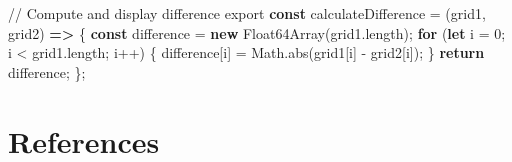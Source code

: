 \documentclass[
  letterpaper,
  DIV=11,
  numbers=noendperiod]{scrreprt}
\newenvironment{Shaded}{\begin{snugshade}}{\end{snugshade}}
\newcommand{\AttributeTok}[1]{\textcolor[rgb]{0.40,0.45,0.13}{#1}}
\newcommand{\BuiltInTok}[1]{\textcolor[rgb]{0.00,0.23,0.31}{#1}}
\newcommand{\CommentTok}[1]{\textcolor[rgb]{0.37,0.37,0.37}{#1}}
\newcommand{\ControlFlowTok}[1]{\textcolor[rgb]{0.00,0.23,0.31}{\textbf{#1}}}
\newcommand{\DecValTok}[1]{\textcolor[rgb]{0.68,0.00,0.00}{#1}}
\newcommand{\FunctionTok}[1]{\textcolor[rgb]{0.28,0.35,0.67}{#1}}
\newcommand{\ImportTok}[1]{\textcolor[rgb]{0.00,0.46,0.62}{#1}}
\newcommand{\KeywordTok}[1]{\textcolor[rgb]{0.00,0.23,0.31}{\textbf{#1}}}
\newcommand{\NormalTok}[1]{\textcolor[rgb]{0.00,0.23,0.31}{#1}}
\newcommand{\OperatorTok}[1]{\textcolor[rgb]{0.37,0.37,0.37}{#1}}
\begin{document}
\label{helpers-grid-difference}%
\begin{Shaded}
\begin{Highlighting}[]
\CommentTok{// Compute and display difference}
\ImportTok{export} \KeywordTok{const}\NormalTok{ calculateDifference }\OperatorTok{=}\NormalTok{ (grid1}\OperatorTok{,}\NormalTok{ grid2) }\KeywordTok{=\textgreater{}}\NormalTok{ \{}
    \KeywordTok{const}\NormalTok{ difference }\OperatorTok{=} \KeywordTok{new} \BuiltInTok{Float64Array}\NormalTok{(grid1}\OperatorTok{.}\AttributeTok{length}\NormalTok{)}\OperatorTok{;}
    \ControlFlowTok{for}\NormalTok{ (}\KeywordTok{let}\NormalTok{ i }\OperatorTok{=} \DecValTok{0}\OperatorTok{;}\NormalTok{ i }\OperatorTok{\textless{}}\NormalTok{ grid1}\OperatorTok{.}\AttributeTok{length}\OperatorTok{;}\NormalTok{ i}\OperatorTok{++}\NormalTok{) \{}
\NormalTok{        difference[i] }\OperatorTok{=} \BuiltInTok{Math}\OperatorTok{.}\FunctionTok{abs}\NormalTok{(grid1[i] }\OperatorTok{{-}}\NormalTok{ grid2[i])}\OperatorTok{;}
\NormalTok{    \}}
    \ControlFlowTok{return}\NormalTok{ difference}\OperatorTok{;}
\NormalTok{\}}\OperatorTok{;}
\end{Highlighting}
\end{Shaded}


\chapter*{References}\label{references}


\label{refs}
\end{document}
